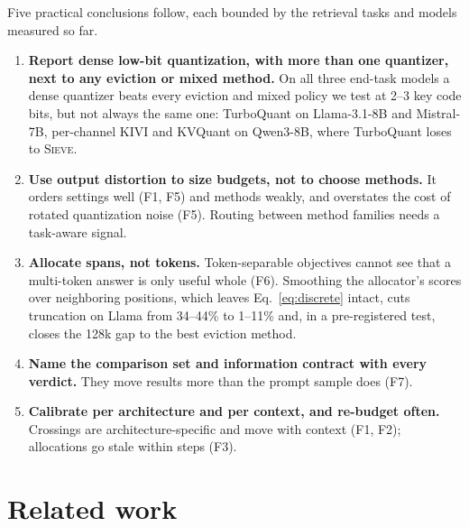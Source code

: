 \documentclass{article}
\newcommand{\sieve}{\textsc{Sieve}}
\theoremstyle{definition}
\begin{document}
Five practical conclusions follow, each bounded by the retrieval tasks and models measured so far.
\begin{enumerate}[leftmargin=*,itemsep=1pt,topsep=2pt]
  \item \textbf{Report dense low-bit quantization, with more than one quantizer, next to any eviction or mixed method.}  On all three end-task models a dense quantizer beats every eviction and mixed policy we test at 2--3 key code bits, but not always the same one: TurboQuant on Llama-3.1-8B and Mistral-7B, per-channel KIVI and KVQuant on Qwen3-8B, where TurboQuant loses to \sieve{}.
  \item \textbf{Use output distortion to size budgets, not to choose methods.}  It orders settings well (F1, F5) and methods weakly, and overstates the cost of rotated quantization noise (F5).  Routing between method families needs a task-aware signal.
  \item \textbf{Allocate spans, not tokens.}  Token-separable objectives cannot see that a multi-token answer is only useful whole (F6).  Smoothing the allocator's scores over neighboring positions, which leaves Eq.~\ref{eq:discrete} intact, cuts truncation on Llama from 34--44\% to 1--11\% and, in a pre-registered test, closes the 128k gap to the best eviction method.
  \item \textbf{Name the comparison set and information contract with every verdict.}  They move results more than the prompt sample does (F7).
  \item \textbf{Calibrate per architecture and per context, and re-budget often.}  Crossings are architecture-specific and move with context (F1, F2); allocations go stale within steps (F3).
\end{enumerate}


\section{Related work}
\label{sec:related}
\end{document}
